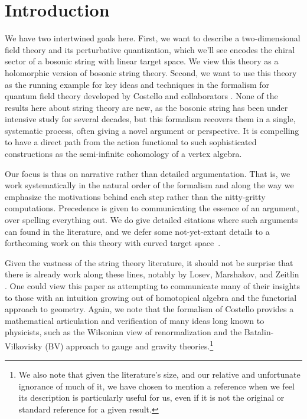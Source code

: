 \section{Introduction}

We have two intertwined goals here.
First, we want to describe a two-dimensional field theory
and its perturbative quantization,
which we'll see encodes the chiral sector of a bosonic string with linear target space.
We view this theory as a holomorphic version of bosonic string theory.
Second, we want to use this theory as the running example for key ideas and techniques in the formalism for quantum field theory developed by Costello and collaborators \cite{CosBook, CG1,CG2, others}.
None of the results here about string theory are new, 
as the bosonic string has been under intensive study for several decades,
but this formalism recovers them in a single, systematic process,
often giving a novel argument or perspective.
It is compelling to have a direct path from the action functional to such sophisticated constructions as the semi-infinite cohomology of a vertex algebra.

Our focus is thus on narrative rather than detailed argumentation.
That is, we work systematically in the natural order of the formalism and along the way we emphasize the motivations behind each step rather than the nitty-gritty computations. 
Precedence is given to communicating the essence of an argument, over spelling everything out.
We do give detailed citations where such arguments can found in the literature,
and we defer some not-yet-extant details to a forthcoming work on this theory with curved target space~\cite{}.

Given the vastness of the string theory literature,
it should not be surprise that there is already work along these lines,
notably by Losev, Marshakov, and Zeitlin \cite{LMZ}.
One could view this paper as attempting to communicate many of their insights to those with an intuition growing out of homotopical algebra and the functorial approach to geometry.
Again, we note that the formalism of Costello provides a mathematical articulation and verification of many ideas long known to physicists, such as the Wilsonian view of renormalization and the Batalin-Vilkovisky (BV) approach to gauge and gravity theories.\footnote{We also note that given the literature's size,
and our relative and unfortunate ignorance of much of it,
we have chosen to mention a reference when we feel its description is particularly useful for us, 
even if it is not the original or standard reference for a given result.}

